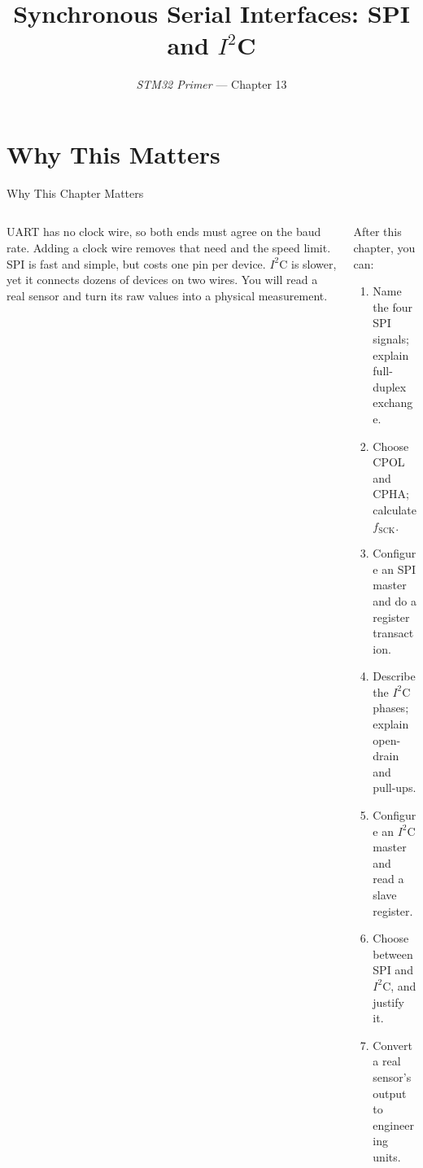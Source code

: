 \documentclass[9pt,aspectratio=169,xcolor=table]{beamer}
\title{Synchronous Serial Interfaces: SPI and $I^2$C}
\subtitle{\emph{STM32 Primer} --- Chapter 13}
\begin{document}
\titlepage

\section{Why This Matters}

\begin{frame}{Why This Chapter Matters}
    \begin{columns}[T]
    \begin{column}{.47\textwidth}
        {\normalsize UART has no clock wire, so both ends must agree on the baud rate. Adding a clock wire removes that need and the speed limit. SPI is fast and simple, but costs one pin per device. $I^2$C is slower, yet it connects dozens of devices on two wires. You will read a real sensor and turn its raw values into a physical measurement.}
    \end{column}
    \begin{column}{.51\textwidth}
        \begin{block}{After this chapter, you can:}
        {\small
        \begin{enumerate}\itemsep2pt
            \item Name the four SPI signals; explain full-duplex exchange.
            \item Choose CPOL and CPHA; calculate $f_{\text{SCK}}$.
            \item Configure an SPI master and do a register transaction.
            \item Describe the $I^2$C phases; explain open-drain and pull-ups.
            \item Configure an $I^2$C master and read a slave register.
            \item Choose between SPI and $I^2$C, and justify it.
            \item Convert a real sensor's output to engineering units.
        \end{enumerate}}
        \end{block}
    \end{column}
    \end{columns}
\end{frame}
\end{document}
